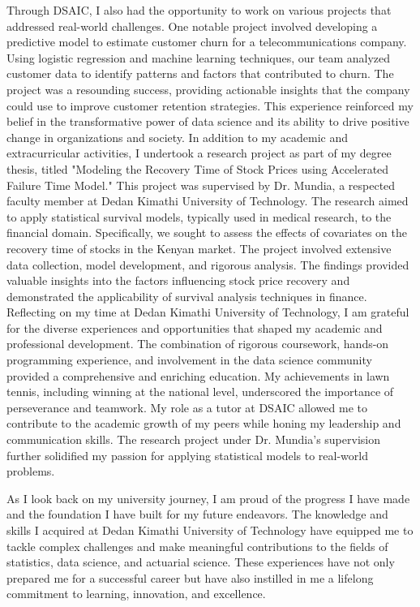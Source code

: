\documentclass[12pt,a4paper,sans,english]{report}
\begin{document}
\noindent Through DSAIC, I also had the opportunity to work on various projects that addressed real-world challenges. One notable project involved developing a predictive model to estimate customer churn for a telecommunications company. Using logistic regression and machine learning techniques, our team analyzed customer data to identify patterns and factors that contributed to churn. The project was a resounding success, providing actionable insights that the company could use to improve customer retention strategies. This experience reinforced my belief in the transformative power of data science and its ability to drive positive change in organizations and society. In addition to my academic and extracurricular activities, I undertook a research project as part of my degree thesis, titled "Modeling the Recovery Time of Stock Prices using Accelerated Failure Time Model." This project was supervised by Dr. Mundia, a respected faculty member at Dedan Kimathi University of Technology. The research aimed to apply statistical survival models, typically used in medical research, to the financial domain. Specifically, we sought to assess the effects of covariates on the recovery time of stocks in the Kenyan market. The project involved extensive data collection, model development, and rigorous analysis. The findings provided valuable insights into the factors influencing stock price recovery and demonstrated the applicability of survival analysis techniques in finance.\\

\noindent Reflecting on my time at Dedan Kimathi University of Technology, I am grateful for the diverse experiences and opportunities that shaped my academic and professional development. The combination of rigorous coursework, hands-on programming experience, and involvement in the data science community provided a comprehensive and enriching education. My achievements in lawn tennis, including winning at the national level, underscored the importance of perseverance and teamwork. My role as a tutor at DSAIC allowed me to contribute to the academic growth of my peers while honing my leadership and communication skills. The research project under Dr. Mundia’s supervision further solidified my passion for applying statistical models to real-world problems.

\noindent As I look back on my university journey, I am proud of the progress I have made and the foundation I have built for my future endeavors. The knowledge and skills I acquired at Dedan Kimathi University of Technology have equipped me to tackle complex challenges and make meaningful contributions to the fields of statistics, data science, and actuarial science. These experiences have not only prepared me for a successful career but have also instilled in me a lifelong commitment to learning, innovation, and excellence.
	
\end{document}

